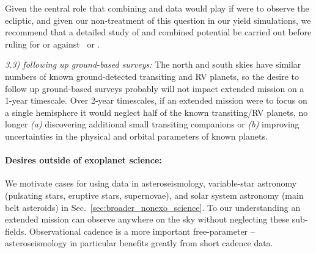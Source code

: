 Given the central role that combining \tess and \ktwo data would play if \tess were to observe the ecliptic, and given our non-treatment of this question in our yield simulations, we recommend that a detailed study of \ktwo and \tesss combined potential be carried out before ruling for or against \elong\ or \eshort.

\textit{3.3) \tess following up ground-based surveys:}
The north and south skies have similar numbers of known ground-detected transiting and RV planets, so the desire to follow up ground-based surveys probably will not impact \tesss extended mission on a 1-year timescale.
Over 2-year timescales, if an extended mission were to focus on a single hemisphere it would neglect half of the known transiting/RV planets, no longer \textit{(a)} discovering additional small transiting companions %
or \textit{(b)} improving uncertainties in the physical and orbital parameters of known planets.


\paragraph{Desires outside of exoplanet science:}
We motivate cases for using \tess data in asteroseismology, variable-star astronomy (pulsating stars, eruptive stars, supernovae), and solar system astronomy (main belt asteroids) in Sec.~\ref{sec:broader_nonexo_science}.
To our understanding an extended mission can observe anywhere on the sky without neglecting these sub-fields.
Observational cadence is a more important free-parameter -- asteroseismology in particular benefits greatly from short cadence data.


